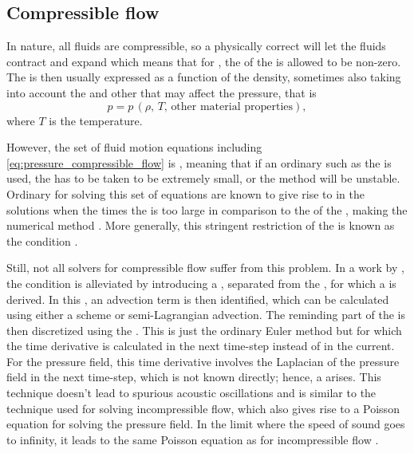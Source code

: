 \subsection{Compressible flow}

In nature, all fluids are compressible, so a physically correct  will let the fluids contract and expand which means that for , the \divergence of the  is allowed to be non-zero. The \pressure is then usually expressed as a function of the density, sometimes also taking into account the \temperature and other \properties that may affect the pressure, that is
%
\begin{equation} \label{eq:pressure_compressible_flow}
p = p\,(\rho,\,T,\,\text{other material properties}),
\end{equation}
%
where $T$ is the temperature.

However, the set of fluid motion equations including \eqref{eq:pressure_compressible_flow} is , meaning that if an ordinary  such as the  is used, the \timestep has to be taken to be extremely small, or the method will be unstable. Ordinary  for solving this set of equations are known to give rise to  in the solutions when the  times the  is too large in comparison to the  of the \cells, making the numerical method \unstable. More generally, this stringent restriction of the \timestep is known as the \CFL condition \citep{Courant1967}.

Still, not all solvers for compressible flow suffer from this problem. In a work by \citet{Kwatra2009}, the \CFL condition is alleviated by introducing a , separated from the , for which a \PDE is derived. In this \PDE, an advection term is then identified, which can be calculated using either a \HO \ENO scheme or semi-Lagrangian advection. The reminding part of the \PDE is then discretized using the . This is just the ordinary Euler method but for which the time derivative is calculated in the next time-step instead of in the current. For the pressure field, this time derivative involves the Laplacian of the pressure field in the next time-step, which is not known directly; hence, a  arises. This technique doesn't lead to spurious acoustic oscillations and is similar to the technique used for solving incompressible flow, which also gives rise to a Poisson equation for solving the pressure field. In the limit where the speed of sound goes to infinity, it leads to the same Poisson equation as for incompressible flow \citep{Kwatra2009}.

